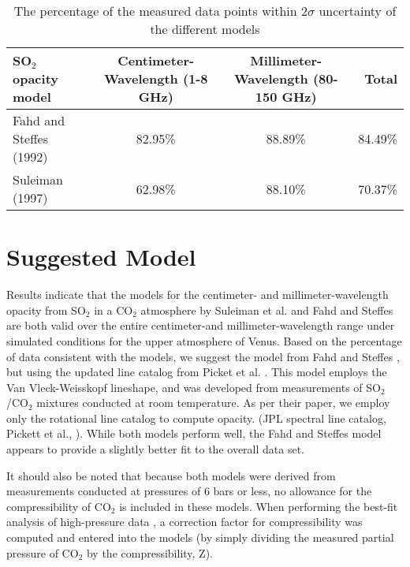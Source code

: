 \begin{sidewaystable}[p]

\caption{The percentage of the measured data points within $2\sigma$ uncertainty of the different models}
  \begin{tabular}{l | c c | r}
  \hline
  \hline
  SO$_2$ opacity model & Centimeter-Wavelength (1-8 GHz) & Millimeter-Wavelength (80-150 GHz) &Total\\
  \hline
   Fahd and Steffes (1992)	 & 82.95\%	& 	88.89\% & 84.49\%\\%
  Suleiman (1997)			 & 62.98\%	&	88.10\% & 70.37\%\\
  \hline
  \hline
  \end{tabular}
  \label{tab:model-comp}
\end{sidewaystable}

 


\clearpage

\section{Suggested Model}
Results indicate that the models for the centimeter- and millimeter-wavelength opacity from SO$_2$ in a CO$_2$ atmosphere by Suleiman et al. \cite{Suleiman-1996} and Fahd and Steffes \cite{Fahd-1991} are both valid over the entire centimeter-and millimeter-wavelength range under simulated conditions for the upper atmosphere of Venus. Based on the percentage of data consistent with the models, we suggest the model from Fahd and Steffes \cite{Fahd-thesis}, but using the updated line catalog from Picket et al. \cite{Pickett-1998}. This model employs the Van Vleck-Weisskopf lineshape, and was developed from measurements of SO$_2$/CO$_2$ mixtures conducted at room temperature. As per their paper, we employ only the rotational line catalog to compute opacity. (JPL spectral line catalog, Pickett et al., \cite{Pickett-1998}). While both models perform well, the Fahd and Steffes \cite{Fahd-1991}  model appears to provide a slightly better fit to the overall data set. 

It should also be noted that because both models were derived from measurements conducted at pressures of 6 bars or less, no allowance for the compressibility of CO$_2$ is included in these models. When performing the best-fit analysis of high-pressure data \cite{Steffes-2015}, a correction factor for compressibility was computed and entered into the models (by simply dividing the measured partial pressure of CO$_2$ by the compressibility, Z). 

